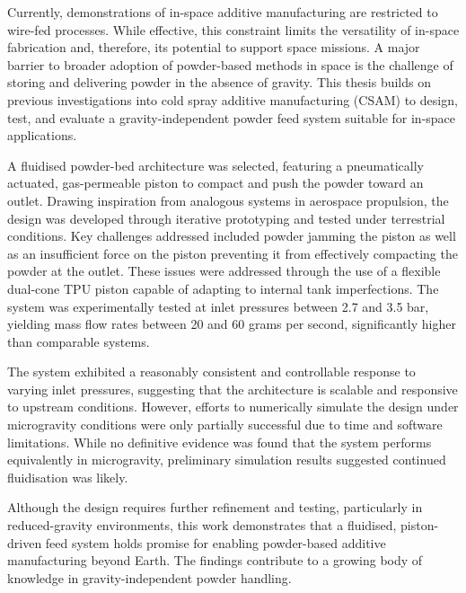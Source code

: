 Currently, demonstrations of in-space additive manufacturing are restricted to wire-fed processes. While effective, this constraint limits the versatility of in-space fabrication and, therefore, its potential to support space missions. A major barrier to broader adoption of powder-based methods in space is the challenge of storing and delivering powder in the absence of gravity. This thesis builds on previous investigations into cold spray additive manufacturing (CSAM) to design, test, and evaluate a gravity-independent powder feed system suitable for in-space applications.

A fluidised powder-bed architecture was selected, featuring a pneumatically actuated, gas-permeable piston to compact and push the powder toward an outlet. Drawing inspiration from analogous systems in aerospace propulsion, the design was developed through iterative prototyping and tested under terrestrial conditions. Key challenges addressed included powder jamming the piston as well as an insufficient force on the piston preventing it from effectively compacting the powder at the outlet. These issues were addressed through the use of a flexible dual-cone TPU piston capable of adapting to internal tank imperfections. The system was experimentally tested at inlet pressures between 2.7 and 3.5 bar, yielding mass flow rates between 20 and 60 grams per second, significantly higher than comparable systems.

The system exhibited a reasonably consistent and controllable response to varying inlet pressures, suggesting that the architecture is scalable and responsive to upstream conditions. However, efforts to numerically simulate the design under microgravity conditions were only partially successful due to time and software limitations. While no definitive evidence was found that the system performs equivalently in microgravity, preliminary simulation results suggested continued fluidisation was likely.

Although the design requires further refinement and testing, particularly in reduced-gravity environments, this work demonstrates that a fluidised, piston-driven feed system holds promise for enabling powder-based additive manufacturing beyond Earth. The findings contribute to a growing body of knowledge in gravity-independent powder handling.